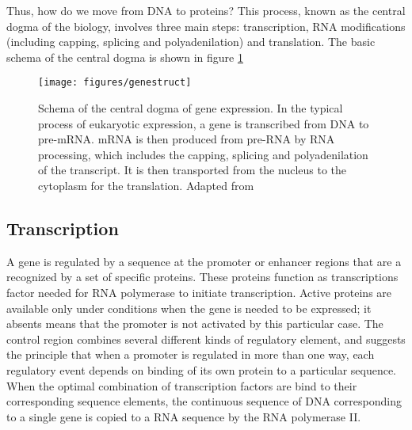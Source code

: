 
Thus, how do we move from DNA to proteins? This process, known as the
central dogma of the biology, involves three main steps:
transcription, RNA modifications (including capping, splicing and
polyadenilation) and translation. The basic schema of the central
dogma is shown in figure \ref{central dogma}

\begin{figure}
\begin{center}
\texttt{[image: figures/genestruct]}
\caption[Schema of the central dogma of gene expression]{Schema of the
central dogma of gene expression. In the typical process of eukaryotic
expression, a gene is transcribed from DNA to pre-mRNA. mRNA is then
produced from pre-RNA by RNA processing, which includes the capping,
splicing and polyadenilation of the transcript. It is then transported
from the nucleus to the cytoplasm for the translation. Adapted from
\cite{zhang:2002a}} \label{central dogma}
\end{center}
\end{figure}

\subsection*{Transcription}

A gene is regulated by a sequence at the promoter or enhancer regions
that are a recognized by a set of specific proteins. These proteins
function as transcriptions factor needed for RNA polymerase to
initiate transcription. Active proteins are available only under
conditions when the gene is needed to be expressed; it absents means
that the promoter is not activated by this particular case. The
control region combines several different kinds of regulatory element,
and suggests the principle that when a promoter is regulated in more
than one way, each regulatory event depends on binding of its own
protein to a particular sequence.  When the optimal combination of
transcription factors are bind to their corresponding sequence
elements, the continuous sequence of DNA corresponding to a single
gene is copied to a RNA sequence by the RNA polymerase II.

